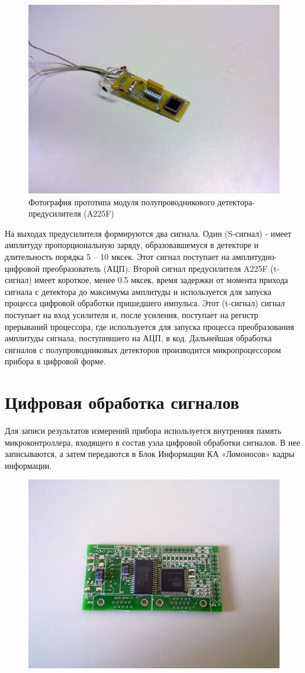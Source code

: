 \begin{figure}
\centering
\includegraphics[width=0.7\linewidth]{images/04062010073}
\caption{Фотография прототипа модуля полупроводникового детектора-предусилителя (A225F)}
\label{fig:a225}
\end{figure}

На выходах предусилителя формируются два сигнала. Один (S-сигнал) - имеет амплитуду пропорциональную заряду, образовавшемуся в детекторе и длительность порядка 5 -- 10 мксек. Этот сигнал поступает на амплитудно-цифровой преобразователь (АЦП). Второй сигнал предусилителя A225F (t-сигнал) имеет короткое, менее 0.5 мксек, время задержки от момента прихода сигнала с детектора до максимума амплитуды и используется для запуска процесса цифровой обработки пришедшего импульса. Этот (t-сигнал) сигнал поступает на вход усилителя и, после усиления, поступает на регистр прерываний процессора, где используется для запуска процесса преобразования амплитуды сигнала, поступившего на АЦП, в код. Дальнейшая обработка сигналов с полупроводниковых детекторов производится микропроцессором прибора в цифровой форме.

\section{Цифровая обработка сигналов}

Для записи результатов измерений прибора используется внутренняя память микроконтроллера, входящего в состав узла цифровой обработки сигналов. В нее записываются, а затем передаются в Блок Информации КА «Ломоносов» кадры информации.
\begin{figure}
\centering
\includegraphics[width=0.7\linewidth]{images/04062010070.jpg}
\caption{}
\label{fig:04062010070}
\end{figure}

